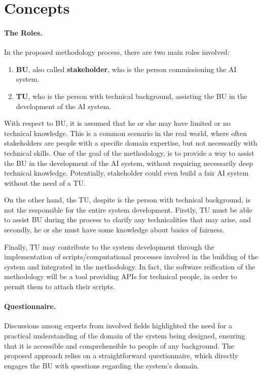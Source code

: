 \documentclass[12pt,a4paper,openright,twoside]{book}
\begin{document}
\section{Concepts}

\paragraph{The Roles.}
In the proposed methodology process, there are two main roles involved:
\begin{enumerate}
    \item \textbf{\ac{BU}}, also called \textbf{stakeholder}, who is the person commissioning the \ac{AI} system.
    \item \textbf{\ac{TU}}, who is the person with technical background, assisting the \ac{BU} in the development of the \ac{AI} system.
\end{enumerate}

With respect to \ac{BU}, it is assumed that he or she may have limited or no technical knowledge.
%
This is a common scenario in the real world, where often stakeholders are people with a specific domain expertise, but not necessarily with technical skills.
%
One of the goal of the methodology, is to provide a way to assist the \ac{BU} in the development of the \ac{AI} system, without requiring necessarily deep technical knowledge.
%
Potentially, stakeholder could even build a fair \ac{AI} system without the need of a \ac{TU}.

On the other hand, the \acl{TU}, despite is the person with technical background, is not the responsible for the entire system development.
%
Firstly, \ac{TU} must be able to assist \ac{BU} during the process to clarify any technicalities that may arise, and secondly, he or she must have some knowledge about basics of fairness.

Finally, \ac{TU} may contribute to the system development through the implementation of scripts/computational processes involved in the building of the system and integrated in the methodology.
%
In fact, the software reification of the methodology will be a tool providing \acp{API} for technical people, in order to permit them to attach their scripts.


\paragraph{Questionnaire.}
Discussions among experts from involved fields highlighted the need for a practical understanding of the domain of the system being designed, ensuring that it is accessible and comprehensible to people of any background.
%
The proposed approach relies on a straightforward questionnaire, which directly engages the \acl{BU} with questions regarding the system's domain.
\end{document}
